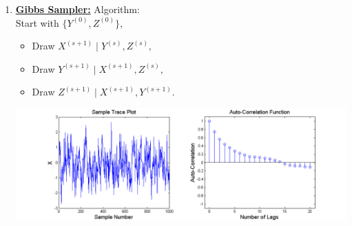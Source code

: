 \documentclass{article}
\begin{document}
\begin{enumerate}
\item {\underline{\textbf{Gibbs Sampler:}}} Algorithm:\\

Start with $\{Y^{(0)},Z^{(0)}\},$ 
\begin{itemize}
\item Draw $X^{(s+1)} \mid Y^{(s)},Z^{(s)},$\\
\item Draw $Y^{(s+1)} \mid X^{(s+1)},Z^{(s)},$\\
\item Draw $Z^{(s+1)} \mid X^{(s+1)},Y^{(s+1)}.$
\end{itemize}

\begin{center}
\includegraphics[scale=0.5]{FirstGibbsSampler.png}
\end{center}

\pagebreak


\end{enumerate}
\end{document}
